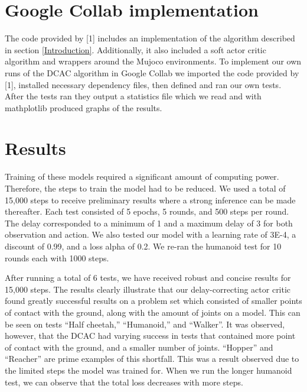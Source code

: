 \documentclass{article} %
\begin{document}
\section{Google Collab implementation}

The code provided by [1] includes an implementation of the algorithm described 
in section \ref{Introduction}.
Additionally, it also included a soft actor critic algorithm and wrappers around
the Mujoco environments. 
To implement our own runs of the DCAC algorithm in Google Collab we imported the code provided by [1],
installed necessary dependency files, then defined and ran our own tests.
After the tests ran they output a statistics file which we read and with mathplotlib produced graphs of the results.

\section{Results}

Training of these models required a significant amount of computing power. Therefore, the steps to train the model had to be reduced. We used a total of 15,000 steps to receive preliminary results where a strong inference can be made thereafter. Each test consisted of 5 epochs, 5 rounds, and 500 steps per round. The delay corresponded to a minimum of 1 and a maximum delay of 3 for both observation and action. We also tested our model with a learning rate of 3E-4, a discount of 0.99, and a loss alpha of 0.2. We re-ran the humanoid test for 10 rounds each with 1000 steps.

After running a total of  6 tests, we have received robust and concise results for 15,000 steps. The results clearly illustrate that our delay-correcting actor critic found greatly successful results on a problem set which consisted of smaller points of contact with the ground, along with the amount of joints on a model. This can be seen on tests “Half cheetah,” “Humanoid,” and “Walker”. It was observed, however, that the DCAC had varying success in tests that contained more point of contact with the ground, and a smaller number of joints. “Hopper” and “Reacher”  are prime examples of this shortfall. This was a result observed due to the limited steps the model was trained for. When we run the longer humanoid test, we can observe that the total loss decreases with more steps.
\end{document}
